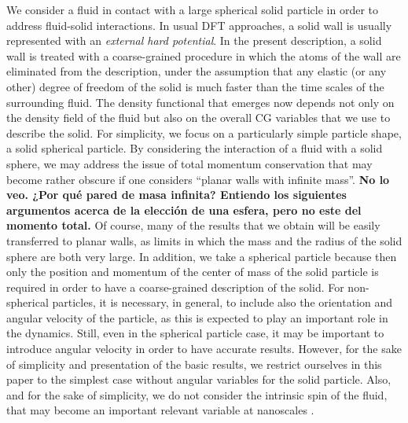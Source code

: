 \documentclass[b5paper,openright,11pt]{book}
\newcommand{\Note}[1]{{\bf \color{red}#1}}    %
\begin{document}
We consider a fluid in contact with a 
large  spherical  solid  particle  in  order  to  address  fluid-solid
interactions.   In  usual DFT  approaches,  a  solid wall  is  usually
represented with  an {\em  external hard  potential}.  In  the present
description, a solid  wall is treated with  a coarse-grained procedure
in which  the atoms of the  wall are eliminated from  the description,
under the assumption that any elastic (or any other) degree of freedom
of the  solid is much faster  than the time scales  of the surrounding
fluid.  The  density functional that  emerges now depends not  only on
the density  field of the fluid  but also on the  overall CG variables
that we use to describe the solid.  For simplicity, we focus on a particularly simple particle shape, a solid spherical particle.  By considering the interaction of a  fluid with a solid sphere, we  may address the issue
of total momentum  conservation that may become rather  obscure if one
considers ``planar walls with infinite mass''. \Note{No lo veo. ¿Por qué pared de masa infinita? Entiendo los siguientes argumentos acerca de la elección de una esfera, pero no este del momento total.}  Of course, many of the
results that we obtain will be  easily transferred to planar walls, as
limits in which the  mass and the radius of the  solid sphere are both
very large.   In addition, we  take a spherical particle  because then
only the  position and  momentum of  the center of  mass of  the solid
particle is required in order  to have a coarse-grained description of
the solid.  For non-spherical particles,  it is necessary, in general,
to include also the orientation  and angular velocity of the particle,
as this is expected to play an important role in the dynamics.  Still,
even in the spherical particle case,  it may be important to introduce
angular velocity in order to  have accurate results.  However, for the
sake of simplicity and presentation  of the basic results, we restrict
ourselves in this paper to the simplest case without angular variables
for the  solid particle. Also, and  for the sake of  simplicity, we do
not  consider the  intrinsic spin  of the  fluid, that  may become  an
important        relevant         variable        at        nanoscales
\cite{Hansen2009,Hansen2011a}.
\end{document}
